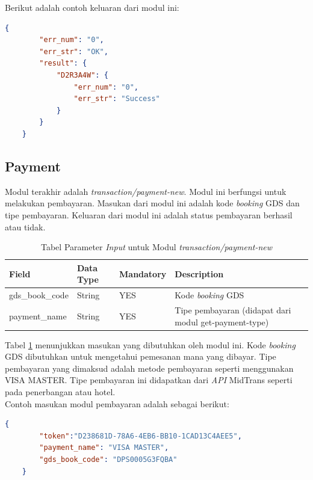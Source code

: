 Berikut adalah contoh keluaran dari modul ini:

\begin{lstlisting}[language=json]
    {
        "err_num": "0",
        "err_str": "OK",
        "result": {
            "D2R3A4W": {
                "err_num": "0",
                "err_str": "Success"
            }
        }
    }
\end{lstlisting}

\subsection{Payment}
\label{subsec:payment}

Modul terakhir adalah \textit{transaction/payment-new}. Modul ini berfungsi untuk melakukan pembayaran. Masukan dari modul ini adalah kode \textit{booking} GDS dan tipe pembayaran. Keluaran dari modul ini adalah status pembayaran berhasil atau tidak.  

\begin{table}[H]
	\centering 
	\caption{Tabel Parameter \textit{Input} untuk Modul \textit{transaction/payment-new}}
	\label{tab:paymentinput}
	\begin{tabular}{|l|l|l|l|}
		\hline
		Field & Data Type & Mandatory & Description\\
		\hline
		
		\hline
        gds\_book\_code & String & YES & Kode \textit{booking} GDS\\
        \hline
        payment\_name & String & YES & Tipe pembayaran (didapat dari modul get-payment-type)\\
        \hline
        
	\end{tabular} 
\end{table}

Tabel \ref{tab:paymentinput} menunjukkan masukan yang dibutuhkan oleh modul ini. Kode \textit{booking} GDS dibutuhkan untuk mengetahui pemesanan mana yang dibayar. Tipe pembayaran yang dimaksud adalah metode pembayaran seperti menggunakan VISA MASTER. Tipe pembayaran ini didapatkan dari \textit{API} MidTrans seperti pada penerbangan atau hotel.\\

Contoh masukan modul pembayaran adalah sebagai berikut:

\begin{lstlisting}[language=json]
    {
        "token":"D238681D-78A6-4EB6-BB10-1CAD13C4AEE5",
        "payment_name": "VISA MASTER",
        "gds_book_code": "DPS0005G3FQBA"
    }
\end{lstlisting}

